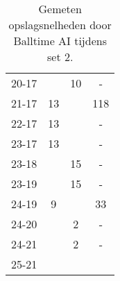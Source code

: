 \begin{table}[ht!]
\begin{tabular}{|c|c|c|c|}
    20-17 &  & 10 & - \\
    21-17 & 13 &  & 118 \\
    22-17 & 13 &  & - \\
    23-17 & 13 &  & - \\
    23-18 &  & 15 & - \\
    23-19 &  & 15 & - \\
    24-19 & 9 &  & 33 \\
    24-20 &  & 2 & - \\
    24-21 &  & 2 & - \\
    25-21 &  &  &  \\ \hline
  \end{tabular}
  \caption[Gemeten opslagsnelheden door Balltime AI tijdens set 2]{\label{tab:PL1ServeAI2}Gemeten opslagsnelheden door Balltime AI tijdens set 2.}
\end{table}